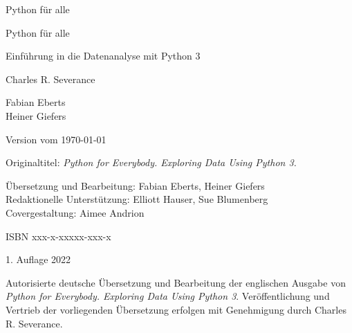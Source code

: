 
\begin{titlepage}
\begin{center}
\vspace*{15mm}

\sffamily
\LARGE
Python für alle

\end{center}
\end{titlepage}


\cleardoublepage
\thispagestyle{plain}

\begin{center}
\vspace*{15mm}

\sffamily
\LARGE
Python für alle

\large
Einführung in die Datenanalyse mit Python 3

\vspace{15mm}

\large
Charles R. Severance

\vspace{20mm}

\normalsize
Fabian Eberts\\
Heiner Giefers

\vspace{105mm}

\normalsize
Version vom \today

\end{center}

\normalsize
\normalfont


\clearpage
\thispagestyle{plain}

Originaltitel: \textit{Python for Everybody. Exploring Data Using Python 3.}
\bigskip

Übersetzung und Bearbeitung: Fabian Eberts, Heiner Giefers\\
Redaktionelle Unterstützung: Elliott Hauser, Sue Blumenberg\\
Covergestaltung: Aimee Andrion
\bigskip

ISBN xxx-x-xxxxx-xxx-x
\bigskip

1. Auflage 2022

Autorisierte deutsche Übersetzung und Bearbeitung der englischen Ausgabe von \textit{Python for Everybody. Exploring Data Using Python 3}. Veröffentlichung und Vertrieb der vorliegenden Übersetzung erfolgen mit Genehmigung durch Charles R. Severance.
\bigskip

